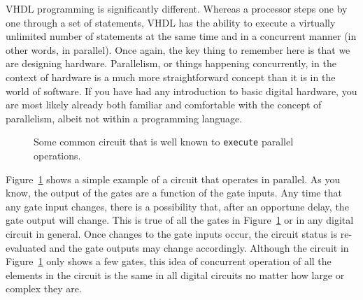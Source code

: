 VHDL programming is significantly different. Whereas a processor steps one by one through a set of statements, VHDL has the ability to execute a virtually unlimited number of statements at the same time and in a concurrent manner (in other words, in parallel). Once again, the key thing to remember here is that we are designing hardware. Parallelism, or things happening concurrently, in the context of hardware is a much more straightforward concept than it is in the world of software. If you have had any introduction to basic digital hardware, you are most likely already both familiar and comfortable with the concept of parallelism, albeit not within a programming language.

\begin{figure}
\centering
\usetikzlibrary{er}
\caption{Some common circuit that is well known to \texttt{execute} parallel operations.}
\label{concurrent_circuit}
\end{figure}

Figure~\ref{concurrent_circuit} shows a simple example of a circuit that operates in parallel. As you know, the output of the gates are a function of the gate inputs. Any time that any gate input changes, there is a possibility that, after an opportune delay, the gate output will change. This is true of all the gates in Figure~\ref{concurrent_circuit} or in any digital circuit in general. Once changes to the gate inputs occur, the circuit status is re-evaluated and the gate outputs may change accordingly. Although the circuit in Figure~\ref{concurrent_circuit} only shows a few gates, this idea of concurrent operation of all the elements in the circuit is the same in all digital circuits no matter how large or complex they are.

